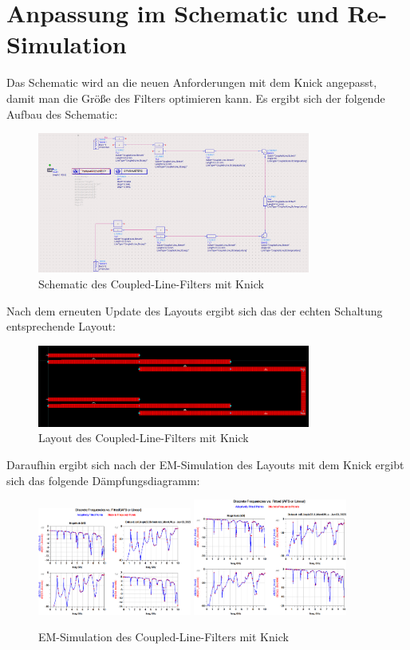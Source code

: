 \section{Anpassung im Schematic und Re-Simulation}
    Das Schematic wird an die neuen Anforderungen mit dem Knick angepasst, damit man die Größe des Filters optimieren kann. Es ergibt sich der folgende Aufbau des Schematic:
    \begin{figure}[H]
        \centering
        \includegraphics[width=0.8\textwidth]{Pictures/SchematicMitKnick.png}
        \caption{Schematic des Coupled-Line-Filters mit Knick}
    \end{figure}
    Nach dem erneuten Update des Layouts ergibt sich das der echten Schaltung entsprechende Layout:
    \begin{figure}[H]
        \centering
        \includegraphics[width=0.8\textwidth]{Pictures/LayoutmitKnick.png}
        \caption{Layout des Coupled-Line-Filters mit Knick}
    \end{figure}
    Daraufhin ergibt sich nach der EM-Simulation des Layouts mit dem Knick ergibt sich das folgende Dämpfungsdiagramm:
    \begin{figure}[H]
        \centering
        \includegraphics[width=0.45\textwidth]{Pictures/EMSimulationohneKnick.png}
        \includegraphics[width=0.45\textwidth]{Pictures/EMSimulationmitKnick.png}
        \caption{EM-Simulation des Coupled-Line-Filters mit Knick}
    \end{figure}

